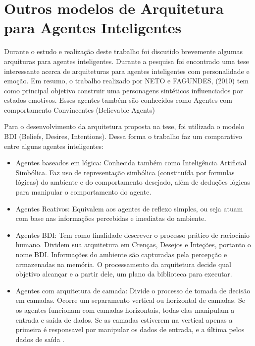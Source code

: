\documentclass[a4paper,12pt]{article}
\begin{document}
\section{Outros modelos de Arquitetura para Agentes Inteligentes}

Durante o estudo e realização deste trabalho foi discutido brevemente algumas arquituras para agentes inteligentes. Durante a pesquisa foi encontrado uma tese interessante acerca de arquiteturas para agentes inteligentes com personalidade e emoção. Em resumo, o trabalho realizado por NETO e FAGUNDES, (2010) tem como principal objetivo construir uma personagens sintéticos influenciados por estados emotivos. Esses agentes também são conhecidos como Agentes com comportamento Convincentes (Believable Agents)

Para o desenvolvimento da arquitetura proposta na tese, foi utilizada o modelo BDI (Beliefs, Desires, Intentions). Dessa forma o trabalho faz um comparativo entre alguns agentes inteligentes: 

\begin{itemize}
    \item Agentes baseados em lógica: Conhecida também como Inteligência Artificial Simbólica. Faz uso de representação simbólica (constituída por formulas lógicas) do ambiente e do comportamento desejado, além de deduções lógicas para manipular o comportamento do agente.

    \item Agentes Reativos: Equivalem aos agentes de reflexo simples, ou seja atuam com base nas informações percebidas e imediatas do ambiente.

    \item Agentes BDI: Tem como finalidade descrever o processo prático de raciocínio humano. Dividem sua arquitetura em Crenças, Desejos e Inteções, portanto o nome BDI. Informações do ambiente são capturadas pela percepção e armazenadas na memória. O processamento da arquitetura decide qual objetivo alcançar e a partir dele, um plano da biblioteca para executar.

    \item Agentes com arquitetura de camada: Divide o processo de tomada de decisão em camadas. Ocorre um separamento vertical ou horizontal de camadas. Se os agentes funcionam com camadas horizontais, todas elas manipulam a entrada e saída de dados. Se as camadas estiverem na vertical apenas a primeira é responsavel por manipular os dados de entrada, e a última pelos dados de saída .
\end{itemize}
\end{document}
